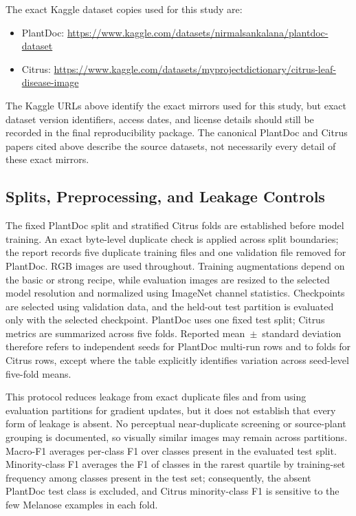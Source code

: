 \documentclass[conference]{IEEEtran}
\begin{document}
The exact Kaggle dataset copies used for this study are:
\begin{itemize}
    \item PlantDoc: \url{https://www.kaggle.com/datasets/nirmalsankalana/plantdoc-dataset}
    \item Citrus: \url{https://www.kaggle.com/datasets/myprojectdictionary/citrus-leaf-disease-image}
\end{itemize}


\DatasetTable

The Kaggle URLs above identify the exact mirrors used for this study, but exact dataset version identifiers, access dates, and license details should still be recorded in the final reproducibility package. The canonical PlantDoc and Citrus papers cited above describe the source datasets, not necessarily every detail of these exact mirrors.

\subsection{Splits, Preprocessing, and Leakage Controls}
The fixed PlantDoc split and stratified Citrus folds are established before model training. An exact byte-level duplicate check is applied across split boundaries; the report records five duplicate training files and one validation file removed for PlantDoc. RGB images are used throughout. Training augmentations depend on the basic or strong recipe, while evaluation images are resized to the selected model resolution and normalized using ImageNet channel statistics. Checkpoints are selected using validation data, and the held-out test partition is evaluated only with the selected checkpoint. PlantDoc uses one fixed test split; Citrus metrics are summarized across five folds. Reported mean~$\pm$~standard deviation therefore refers to independent seeds for PlantDoc multi-run rows and to folds for Citrus rows, except where the table explicitly identifies variation across seed-level five-fold means.

This protocol reduces leakage from exact duplicate files and from using evaluation partitions for gradient updates, but it does not establish that every form of leakage is absent. No perceptual near-duplicate screening or source-plant grouping is documented, so visually similar images may remain across partitions. Macro-F1 averages per-class F1 over classes present in the evaluated test split. Minority-class F1 averages the F1 of classes in the rarest quartile by training-set frequency among classes present in the test set; consequently, the absent PlantDoc test class is excluded, and Citrus minority-class F1 is sensitive to the few Melanose examples in each fold.
\end{document}
